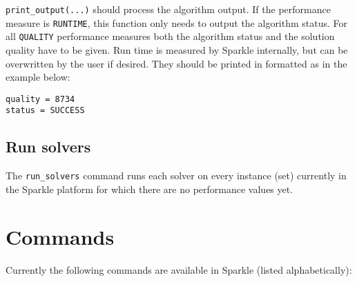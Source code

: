\documentclass{article}
\begin{document}
\texttt{print\_output(...)} should process the algorithm output. If the performance measure is \texttt{RUNTIME}, this function only needs to output the algorithm status. For all \texttt{QUALITY} performance measures both the algorithm status and the solution quality have to be given. Run time is measured by Sparkle internally, but can be overwritten by the user if desired. They should be printed in formatted as in the example below:
\begin{verbatim}
quality = 8734
status = SUCCESS
\end{verbatim}

\subsection{Run solvers}
The \texttt{run\_solvers} command runs each solver on every instance (set) currently in the Sparkle platform for which there are no performance values yet.

\section{Commands}

Currently the following commands are available in Sparkle (listed alphabetically):
\end{document}
